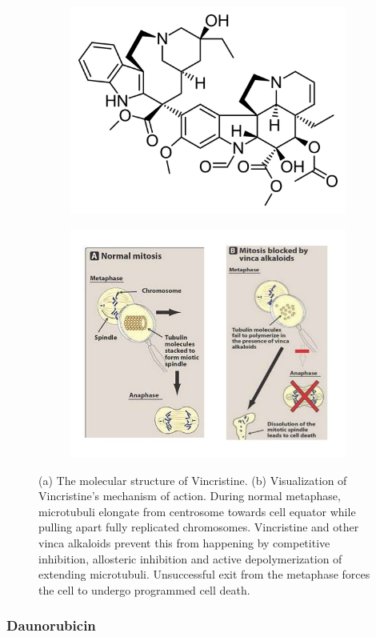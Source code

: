 \documentclass[pdftex,12pt,a4paper]{report}
\begin{document}
\begin{figure}[H]
\centering
\begin{subfigure}{.8\textwidth}
  \centering
  \includegraphics[width=.3\textwidth]{images/vincristine}
  \caption{}
  \label{fig:vincristine}
\end{subfigure}
\centering
\begin{subfigure}{.9\textwidth}
  \centering
  \includegraphics[width=.8\textwidth]{images/vincristine_mechanism}
  \caption{}
  \label{fig:vinchristine_mechanism}
\end{subfigure}
\caption[The structure and mechanism of Vincristine]{(a) The molecular structure of Vincristine. (b) Visualization of Vincristine's mechanism of action. During normal metaphase, microtubuli elongate from centrosome towards cell equator while pulling apart fully replicated chromosomes. Vincristine and other vinca alkaloids prevent this from happening by competitive inhibition, allosteric inhibition and active depolymerization of extending microtubuli. Unsuccessful exit from the metaphase forces the cell to undergo programmed cell death.}
\label{fig:vincs}
\end{figure}

\subsubsection*{Daunorubicin}
\end{document}
